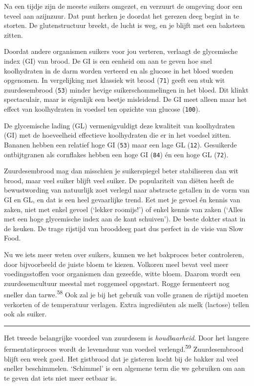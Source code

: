 \documentclass[
  11pt,
  dutch,
]{memoir}
\begin{document}
Na een tijdje zijn de meeste suikers omgezet, en verzuurt de omgeving
door een teveel aan azijnzuur. Dat punt herken je doordat het gerezen
deeg begint in te storten. De glutenstructuur breekt, de lucht is weg,
en je blijft met een baksteen zitten.

Doordat andere organismen suikers voor jou verteren, verlaagt de
glycemische index (GI) van brood. De GI is een eenheid om aan te geven
hoe snel koolhydraten in de darm worden verteerd en als glucose in het
bloed worden opgenomen. In vergelijking met klassiek wit brood
(\texttt{71}) geeft een stuk wit zuurdesembrood (\texttt{53}) minder
hevige suikerschommelingen in het bloed. Dit klinkt spectaculair, maar
is eigenlijk een beetje misleidend. De GI meet alleen maar het effect
van koolhydraten in voedsel ten opzichte van glucose (\texttt{100}).

De glycemische lading (GL) vermenigvuldigt deze kwaliteit van
koolhydraten (GI) met de hoeveelheid effectieve koolhydraten die er in
het voedsel zitten. Bananen hebben een relatief hoge GI (\texttt{53})
maar een lage GL (\texttt{12}). Gesuikerde ontbijtgranen als cornflakes
hebben een hoge GI (\texttt{84}) én een hoge GL (\texttt{72}).

Zuurdesembrood mag dan misschien je suikerspiegel beter stabiliseren dan
wit brood, maar veel suiker blijft veel suiker. De populariteit van
diëten heeft de bewustwording van natuurlijk zoet verlegd naar abstracte
getallen in de vorm van GI en GL, en dat is een heel gevaarlijke trend.
Eet met je gevoel én kennis van zaken, niet met enkel gevoel (`lekker
roomijs!') of enkel kennis van zaken (`Alles met een hoge glycemische
index aan de kant schuiven'). De beste dokter staat in de keuken. De
trage rijstijd van brooddeeg past dus perfect in de visie van Slow Food.

Nu we iets meer weten over suikers, kunnen we het bakproces beter
controleren, door bijvoorbeeld de juiste bloem te kiezen. Volkoren meel
bevat veel meer voedingsstoffen voor organismen dan gezeefde, witte
bloem. Daarom wordt een zuurdesemcultuur meestal met roggemeel
opgestart. Rogge fermenteert nog sneller dan tarwe.\textsuperscript{58}
Ook zal je bij het gebruik van volle granen de rijstijd moeten verkorten
of de temperatuur verlagen. Extra ingrediënten als melk (lactose) tellen
ook als suiker.

\pfbreak

Het tweede belangrijke voordeel van zuurdesem is \emph{houdbaarheid}.
Door het langere fermentatieproces wordt de levensduur van voedsel
verlengd.\textsuperscript{59} Zuurdesembrood blijft een week goed. Het
gistbrood dat je gisteren kocht bij de bakker zal veel sneller
beschimmelen. `Schimmel' is een algemene term die we gebruiken om aan te
geven dat iets niet meer eetbaar is.
\end{document}
